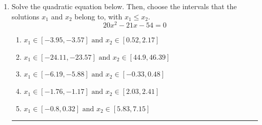 \documentclass[14pt]{extbook}
\newcommand{\litem}[1]{\item#1\hspace*{-1cm}\rule{\textwidth}{0.4pt}}
\begin{document}
\begin{enumerate}
{\begin{enumerate}[label=\Alph*.]
\end{enumerate} }
\litem{
Solve the quadratic equation below. Then, choose the intervals that the solutions $x_1$ and $x_2$ belong to, with $x_1 \leq x_2$.\[ 20x^{2} -21 x -54 = 0 \]\begin{enumerate}[label=\Alph*.]
\item \( x_1 \in [-3.95, -3.57] \text{ and } x_2 \in [0.52, 2.17] \)
\item \( x_1 \in [-24.11, -23.57] \text{ and } x_2 \in [44.9, 46.39] \)
\item \( x_1 \in [-6.19, -5.88] \text{ and } x_2 \in [-0.33, 0.48] \)
\item \( x_1 \in [-1.76, -1.17] \text{ and } x_2 \in [2.03, 2.41] \)
\item \( x_1 \in [-0.8, 0.32] \text{ and } x_2 \in [5.83, 7.15] \)


\end{enumerate}}
\end{enumerate}
\end{document}
